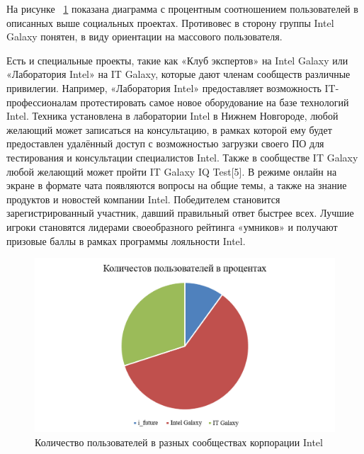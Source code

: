 \documentclass[a4paper,english,russian]{G2-105}
\begin{document}
\par На рисунке ~\ref{diagram1} показана диаграмма с процентным соотношением пользователей в описанных выше социальных проектах. Противовес в сторону группы Intel Galaxy понятен, в виду ориентации на массового пользователя.
\par Есть и специальные проекты, такие как «Клуб экспертов» на Intel Galaxy или «Лаборатория Intel» на IT Galaxy, которые дают членам сообществ различные привилегии. Например, «Лаборатория Intel» предоставляет возможность IT-профессионалам протестировать самое новое оборудование на базе технологий Intel. Техника установлена в лаборатории Intel в Нижнем Новгороде, любой желающий может записаться на консультацию, в рамках которой ему будет предоставлен удалённый доступ с возможностью загрузки своего ПО для тестирования и консультации специалистов Intel. Также в сообществе IT Galaxy любой желающий может пройти IT Galaxy IQ Test[5]. В режиме онлайн на экране в формате чата появляются вопросы на общие темы, а также на знание продуктов и новостей компании Intel. Победителем становится зарегистрированный участник, давший правильный ответ быстрее всех. Лучшие игроки становятся лидерами своеобразного рейтинга «умников» и получают призовые баллы в рамках программы лояльности Intel.
\begin{figure}
    \includegraphics[width=\linewidth]{diagram1.png}
    \caption{Количество пользователей в разных сообществах корпорации Intel}
	\label{diagram1}
\end{figure}
\end{document}
